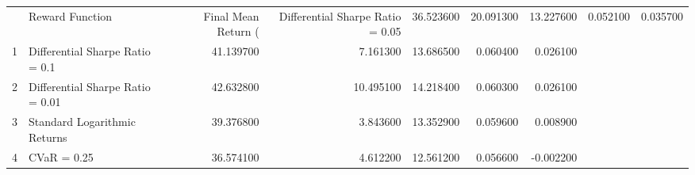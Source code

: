 \begin{tabular}{llrrrrr}
\toprule
 & Reward Function & Final Mean Return (%
 & Differential Sharpe Ratio = 0.05 & 36.523600 & 20.091300 & 13.227600 & 0.052100 & 0.035700 \\
1 & Differential Sharpe Ratio = 0.1 & 41.139700 & 7.161300 & 13.686500 & 0.060400 & 0.026100 \\
2 & Differential Sharpe Ratio = 0.01 & 42.632800 & 10.495100 & 14.218400 & 0.060300 & 0.026100 \\
3 & Standard Logarithmic Returns & 39.376800 & 3.843600 & 13.352900 & 0.059600 & 0.008900 \\
4 & CVaR = 0.25 & 36.574100 & 4.612200 & 12.561200 & 0.056600 & -0.002200 \\
\bottomrule
\end{tabular}
